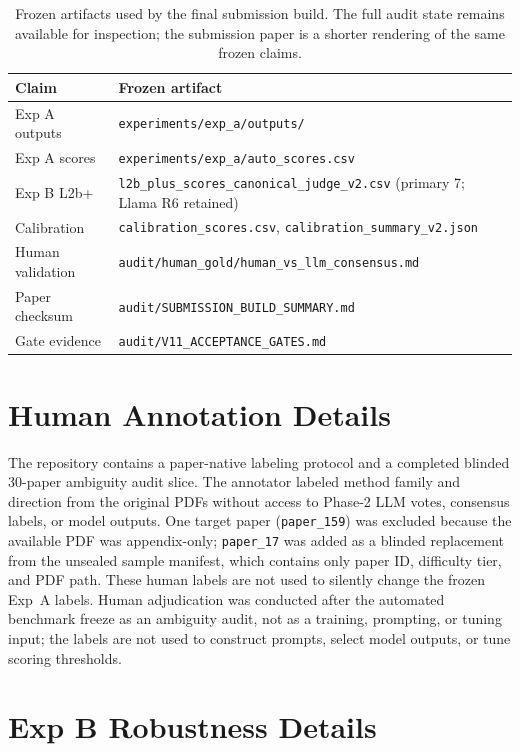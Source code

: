 \documentclass{article}
\begin{document}
\begin{table}[h]
\centering
\caption{Frozen artifacts used by the final submission build. The full audit
state remains available for inspection; the submission paper is a shorter
rendering of the same frozen claims.}
\label{tab:artifacts}
\small
\renewcommand{\arraystretch}{1.12}
\begin{tabular}{ll}
\toprule
\textbf{Claim} & \textbf{Frozen artifact} \\
\midrule
Exp A outputs & \texttt{experiments/exp\_a/outputs/} \\
Exp A scores & \texttt{experiments/exp\_a/auto\_scores.csv} \\
Exp B L2b+ & \texttt{l2b\_plus\_scores\_canonical\_judge\_v2.csv} (primary 7; Llama R6 retained) \\
Calibration & \texttt{calibration\_scores.csv}, \texttt{calibration\_summary\_v2.json} \\
Human validation & \texttt{audit/human\_gold/human\_vs\_llm\_consensus.md} \\
Paper checksum & \texttt{audit/SUBMISSION\_BUILD\_SUMMARY.md} \\
Gate evidence & \texttt{audit/V11\_ACCEPTANCE\_GATES.md} \\
\bottomrule
\end{tabular}
\end{table}

\section{Human Annotation Details}
\label{app:human}

The repository contains a paper-native labeling protocol and a completed
blinded 30-paper ambiguity audit slice. The annotator labeled method family and
direction from the original PDFs without access to Phase-2 LLM votes, consensus
labels, or model outputs. One target paper (\texttt{paper\_159}) was excluded
because the available PDF was appendix-only; \texttt{paper\_17} was added as a
blinded replacement from the unsealed sample manifest, which contains only
paper ID, difficulty tier, and PDF path. These human labels are not used to
silently change the frozen Exp~A labels. Human adjudication was conducted after
the automated benchmark freeze as an ambiguity audit, not as a training,
prompting, or tuning input; the labels are not used to construct prompts,
select model outputs, or tune scoring thresholds.

\section{Exp B Robustness Details}
\label{app:expb-robustness}
\end{document}
